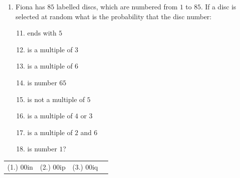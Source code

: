 \begin{exercises}{}
{\begin{enumerate}[itemsep=6pt, label=\textbf{\arabic*}. ]
\begin{enumerate}[noitemsep, label=\textbf{(\alph*)} ]
    \item a female
    \item a $4$ year old male
    \item aged $3$ or $4$
    \item aged $3$ and $4$
    \item not $5$
    \item either $3$ or female?
    \end{enumerate}
\item
Fiona has $85$ labelled discs, which are numbered from $1$ to
    $85$. If a disc is selected at random what is the probability that
    the disc number:
  \begin{enumerate}[noitemsep, label=\textbf{(\alph*)} ]
\setcounter{enumi}{10}
    \item ends with $5$
    \item is a multiple of $3$
    \item is a multiple of $6$
    \item is number $65$
    \item is not a multiple of $5$
    \item is a multiple of $4$ or $3$
    \item is a multiple of $2$ and $6$
    \item is number $1$?
    \end{enumerate}

 \end{enumerate}
\practiceinfo
  \begin{tabularx}{\textwidth}{XXXX}
    (1.) 00in& (2.) 00ip& (3.) 00iq\\
  \end{tabularx}
}
\end{exercises}
